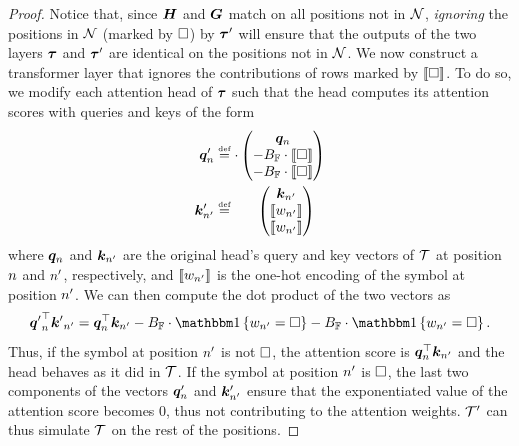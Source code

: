 \begin{proof}
   Notice that, since ${{{{{{{\bm{H}}}}}}}}$ and ${{{\bm{G}}}}$ match on all positions not in ${{{\mathcal{N}}}}$, \emph{ignoring} the positions in ${{{\mathcal{N}}}}$ (marked by ${\square}$) by ${{\boldsymbol{\tau}}}'$ will ensure that the outputs of the two layers ${{\boldsymbol{\tau}}}$ and ${{\boldsymbol{\tau}}}'$ are identical on the positions not in ${{{\mathcal{N}}}}$.
   We now construct a transformer layer that ignores the contributions of rows marked by ${{\llbracket{\square}\rrbracket}}$.
   To do so, we modify each attention head of ${{\boldsymbol{\tau}}}$ such that the head computes its attention scores with queries and keys of the form 
   \begin{subequations}
      \begin{align}
         \vq'_\stridx &\defeq \cdot 
         \begin{pmatrix}
            \vq_\stridx \\
            -\maxFNum \cdot \onehot{\padSym} \\
            -\maxFNum \cdot \onehot{\padSym} \\
         \end{pmatrix} \\
         \vk'_{\stridx'} &\defeq \phantom{\maxFNum \cdot} 
         \begin{pmatrix}
            \vk_{\stridx'} \\
            \onehot{\sym_{\stridx'}} \\
            \onehot{\sym_{\stridx'}}
         \end{pmatrix}
      \end{align}
   \end{subequations}
   where ${{{\bm{q}}}}_{{n}}$ and ${{{\bm{k}}}}_{{{n}}'}$ are the original head's query and key vectors of ${{\mathcal{T}}}$ at position ${{n}}$ and ${{n}}'$, respectively, and ${{\llbracket{{w}}_{{{n}}'}\rrbracket}}$ is the one-hot encoding of the symbol at position ${{n}}'$.
   We can then compute the dot product of the two vectors as
   \begin{equation}
      \inner{{\vq'}_\stridx}{{\vk'}_{\stridx'}} = \inner{\vq_\stridx}{\vk_{\stridx'}} - \maxFNum \cdot \ind{\sym_{\stridx'} = \padSym} - \maxFNum \cdot \ind{\sym_{\stridx'} = \padSym}.
   \end{equation}
   Thus, if the symbol at position ${{n}}'$ is not ${\square}$, the attention score is ${{{{{\bm{q}}}}_{{n}}^\top {{{\bm{k}}}}_{{{n}}'}}}$ and the head behaves as it did in ${{\mathcal{T}}}$.
   If the symbol at position ${{n}}'$ is ${\square}$, the last two components of the vectors ${{{\bm{q}}}}'_{{n}}$ and ${{{\bm{k}}}}'_{{{n}}'}$ ensure that the exponentiated value of the attention score becomes $0$, thus not contributing to the attention weights.
   ${{\mathcal{T}}}'$ can thus simulate ${{\mathcal{T}}}$ on the rest of the positions.
\end{proof}

